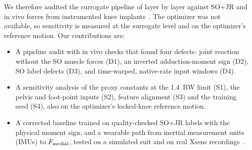 We therefore audited the surrogate pipeline of \Chong{} layer by layer against SO+JR and in
vivo forces from instrumented knee implants~\cite{fregly2012}. The optimizer was not available, so sensitivity is measured at the
surrogate level and on the optimizer's reference motion. Our contributions are:
\begin{itemize}
\item A pipeline audit with in vivo checks that found four defects: joint reaction without the SO
  muscle forces (D1), an inverted adduction-moment sign (D2), SO label defects (D3), and
  time-warped, native-rate input windows (D4).
\item A sensitivity analysis of the proxy constants at the 1.4~BW limit (S1), the pelvis and foot-point
  inputs (S2), feature alignment (S3) and the training seed (S4), also on the optimizer's
  locked-knee reference motion.
\item A corrected baseline trained on quality-checked SO+JR labels with the physical moment sign,
  and a wearable path from inertial measurement units (IMUs) to $F_{\mathrm{medial}}$, tested on a simulated
  suit and on real Xsens recordings~\cite{wang2023twente}.
\end{itemize}
